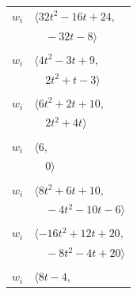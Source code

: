 \documentclass[11pt]{article}
\begin{document}
\begin{longtable}{@{}ll@{}}
$w_i$ & $\langle 32t^{2}-16t+24,$\\
 & $\quad -32t-8\rangle$\\
\addlinespace[2pt]
\multicolumn{2}{@{}p{0.97\textwidth}@{}}{$i=19$, $D_i=1$, $\rho_{ij}$: $1{:}1, \allowbreak 2{:}2, \allowbreak 3{:}2, \allowbreak 9{:}2, \allowbreak 35{:}1, \allowbreak 36{:}2, \allowbreak 40{:}3, \allowbreak 41{:}2$}\\
$w_i$ & $\langle 4t^{2}-3t+9,$\\
 & $\quad 2t^{2}+t-3\rangle$\\
\addlinespace[2pt]
\multicolumn{2}{@{}p{0.97\textwidth}@{}}{$i=20$, $D_i=1$, $\rho_{ij}$: $0{:}3, \allowbreak 28{:}1, \allowbreak 33{:}1, \allowbreak 34{:}1, \allowbreak 36{:}2, \allowbreak 40{:}1, \allowbreak 43{:}2, \allowbreak 46{:}3$}\\
$w_i$ & $\langle 6t^{2}+2t+10,$\\
 & $\quad 2t^{2}+4t\rangle$\\
\addlinespace[2pt]
\multicolumn{2}{@{}p{0.97\textwidth}@{}}{$i=21$, $D_i=1$, $\rho_{ij}$: $15{:}1, \allowbreak 35{:}3, \allowbreak 41{:}3, \allowbreak 42{:}2$}\\
$w_i$ & $\langle 6,$\\
 & $\quad 0\rangle$\\
\addlinespace[2pt]
\multicolumn{2}{@{}p{0.97\textwidth}@{}}{$i=22$, $D_i=1$, $\rho_{ij}$: $12{:}2, \allowbreak 14{:}2, \allowbreak 16{:}2, \allowbreak 28{:}1, \allowbreak 33{:}3, \allowbreak 37{:}3, \allowbreak 44{:}1$}\\
$w_i$ & $\langle 8t^{2}+6t+10,$\\
 & $\quad -4t^{2}-10t-6\rangle$\\
\addlinespace[2pt]
\multicolumn{2}{@{}p{0.97\textwidth}@{}}{$i=23$, $D_i=1$, $\rho_{ij}$: $7{:}2, \allowbreak 8{:}3, \allowbreak 12{:}2, \allowbreak 13{:}3, \allowbreak 29{:}1, \allowbreak 35{:}1, \allowbreak 37{:}3, \allowbreak 40{:}1$}\\
$w_i$ & $\langle -16t^{2}+12t+20,$\\
 & $\quad -8t^{2}-4t+20\rangle$\\
\addlinespace[2pt]
\multicolumn{2}{@{}p{0.97\textwidth}@{}}{$i=24$, $D_i=1$, $\rho_{ij}$: $1{:}1, \allowbreak 4{:}3, \allowbreak 6{:}2, \allowbreak 7{:}2, \allowbreak 8{:}2, \allowbreak 10{:}2, \allowbreak 17{:}3, \allowbreak 32{:}2, \allowbreak 40{:}2, \allowbreak 41{:}3, \allowbreak 43{:}1, \allowbreak 44{:}2, \allowbreak 46{:}2$}\\
$w_i$ & $\langle 8t-4,$\\

\end{longtable}
\end{document}
